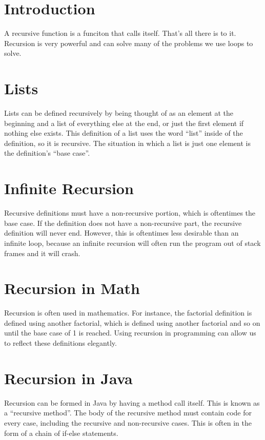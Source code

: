 \documentclass{article}
\begin{document}
\maketitle
\tableofcontents

\section{Introduction}
A recursive function is a funciton that calls itself. That's all there is to
it. Recursion is very powerful and can solve many of the problems we use loops
to solve.

\section{Lists}
Lists can be defined recursively by being thought of as an element at the
beginning and a list of everything else at the end, or just the first element
if nothing else exists. This definition of a list uses the word ``list'' inside
of the definition, so it is recursive. The situation in which a list is just
one element is the definition's ``base case''.

\section{Infinite Recursion}
Recursive definitions must have a non-recursive portion, which is oftentimes
the base case. If the definition does not have a non-recursive part, the
recursive definition will never end. However, this is oftentimes less desirable
than an infinite loop, because an infinite recursion will often run the program
out of stack frames and it will crash.

\section{Recursion in Math}
Recursion is often used in mathematics. For instance, the factorial definition
is defined using another factorial, which is defined using another factorial
and so on until the base case of 1 is reached. Using recursion in programming
can allow us to reflect these definitions elegantly.

\section{Recursion in Java}
Recursion can be formed in Java by having a method call itself. This is known
as a ``recursive method''. The body of the recursive method must contain code
for every case, including the recursive and non-recursive cases. This is often
in the form of a chain of if-else statements.
\end{document}
